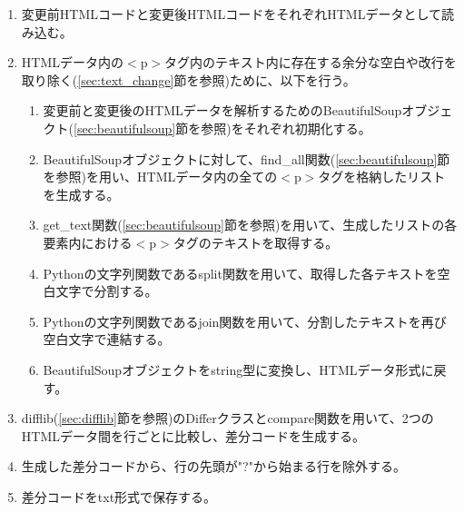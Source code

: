 \begin{enumerate}
    \item 変更前HTMLコードと変更後HTMLコードをそれぞれHTMLデータとして読み込む。
    \item HTMLデータ内の$<$p$>$タグ内のテキスト内に存在する余分な空白や改行を取り除く(\ref{sec:text_change}節を参照)ために、以下を行う。
          \begin{enumerate}
              \item 変更前と変更後のHTMLデータを解析するためのBeautifulSoupオブジェクト(\ref{sec:beautifulsoup}節を参照)をそれぞれ初期化する。
              \item BeautifulSoupオブジェクトに対して、find\_all関数(\ref{sec:beautifulsoup}節を参照)を用い、HTMLデータ内の全ての$<$p$>$タグを格納したリストを生成する。
              \item get\_text関数(\ref{sec:beautifulsoup}節を参照)を用いて、生成したリストの各要素内における$<$p$>$タグのテキストを取得する。
              \item Pythonの文字列関数であるsplit関数を用いて、取得した各テキストを空白文字で分割する。
              \item Pythonの文字列関数であるjoin関数を用いて、分割したテキストを再び空白文字で連結する。
              \item BeautifulSoupオブジェクトをstring型に変換し、HTMLデータ形式に戻す。
          \end{enumerate}
    \item difflib(\ref{sec:difflib}節を参照)のDifferクラスとcompare関数を用いて、2つのHTMLデータ間を行ごとに比較し、差分コードを生成する。
    \item 生成した差分コードから、行の先頭が"?"から始まる行を除外する。
    \item 差分コードをtxt形式で保存する。
\end{enumerate}



